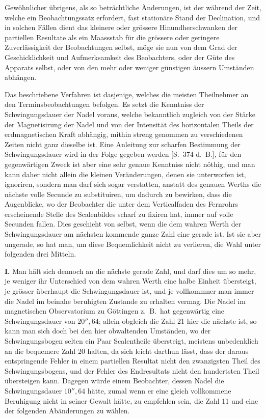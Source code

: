 \documentclass[12pt,a4paper]{article}
\begin{document}
Gew\"ohnlicher \"ubrigens, als so betr\"achtliche \"Anderungen, ist der w\"ahrend der Zeit, welche ein Beobachtungssatz erfordert, fast station\"are Stand der Declination, und in solchen F\"allen dient das kleinere oder gr\"ossere Hinundherschwanken der partiellen Resultate als ein Maassstab f\"ur die gr\"ossere oder geringere Zuverl\"assigkeit der Beobachtungen selbst, m\"oge sie nun von dem Grad der Geschicklichkeit und Aufmerksamkeit des Beobachters, oder der G\"ute des Apparats selbst, oder von den mehr oder weniger g\"unstigen \"aussern Umst\"anden abh\"angen.

Das beschriebene Verfahren ist dasjenige, welches die meisten Theilnehmer an den Terminsbeobachtungen befolgen. Es setzt die Kenntniss der Schwingungsdauer der Nadel voraus, welche bekanntlich zugleich von der St\"arke der Magnetisirung der Nadel und von der Intensit\"at des horizontalen Theils der erdmagnetischen Kraft abh\"angig, mithin streng genommen zu verschiedenen Zeiten nicht ganz dieselbe ist. Eine Anleitung zur scharfen Bestimmung der Schwingungsdauer wird in der Folge gegeben werden [S.~374 d.~B.], f\"ur den gegenw\"artigen Zweck ist aber eine sehr genaue Kenntniss nicht n\"othig, und man kann daher nicht allein die kleinen Ver\"anderungen, denen sie unterworfen ist, ignoriren, sondern man darf sich sogar verstatten, anstatt des genauen Werths die n\"achste volle Secunde zu substituiren, um dadurch zu bewirken, dass die Augenblicke, wo der Beobachter die unter dem Verticalfaden des Fernrohrs erscheinende Stelle des Scalenbildes scharf zu fixiren hat, immer auf volle Secunden fallen. Dies geschieht von selbst, wenn die dem wahren Werth der Schwingungsdauer am n\"achsten kommende ganze Zahl eine gerade ist. Ist sie aber ungerade, so hat man, um diese Bequemlichkeit nicht zu verlieren, die Wahl unter folgenden drei Mitteln.

\newpage
\noindent
\textbf{I.} Man h\"alt sich dennoch an die n\"achste gerade Zahl, und darf dies um so mehr, je weniger ihr Unterschied von dem wahren Werth eine halbe Einheit \"ubersteigt, je gr\"osser \"uberhaupt die Schwingungsdauer ist, und je vollkommner man immer die Nadel im beinahe beruhigten Zustande zu erhalten vermag. Die Nadel im magnetischen Observatorium zu G\"ottingen z.~B.\ hat gegenw\"artig eine Schwingungsdauer von $20''{,}64$; allein obgleich die Zahl 21 hier die n\"achste ist, so kann man sich doch bei den hier obwaltenden Umst\"anden, wo der Schwingungsbogen selten ein Paar Scalentheile \"ubersteigt, meistens unbedenklich an die bequemere Zahl 20 halten, da sich leicht darthun l\"asst, dass der daraus entspringende Fehler in einem partiellen Resultat nicht den zwanzigsten Theil des Schwingungsbogens, und der Fehler des Endresultats nicht den hundertsten Theil \"ubersteigen kann. Dagegen w\"urde einem Beobachter, dessen Nadel die Schwingungsdauer $10''{,}64$ h\"atte, zumal wenn er eine gleich vollkommene Beruhigung nicht in seiner Gewalt h\"atte, zu empfehlen sein, die Zahl 11 und eine der folgenden Ab\"anderungen zu w\"ahlen.
\end{document}
